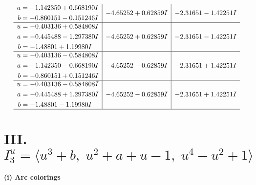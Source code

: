 \documentclass[1p]{elsarticle_modified}
\theoremstyle{definition}
\begin{document}
$$\begin{array}{c|c|c}
\begin{aligned}
a &= -1.142350 + 0.668190 I \\
b &= -0.860151 - 0.151246 I\end{aligned}
 & -4.65252 + 0.62859 I & -2.31651 - 1.42251 I \\ \hline\begin{aligned}
u &= -0.403136 + 0.584808 I \\
a &= -0.445488 - 1.297380 I \\
b &= -1.48801 + 1.19980 I\end{aligned}
 & -4.65252 + 0.62859 I & -2.31651 - 1.42251 I \\ \hline\begin{aligned}
u &= -0.403136 - 0.584808 I \\
a &= -1.142350 - 0.668190 I \\
b &= -0.860151 + 0.151246 I\end{aligned}
 & -4.65252 - 0.62859 I & -2.31651 + 1.42251 I \\ \hline\begin{aligned}
u &= -0.403136 - 0.584808 I \\
a &= -0.445488 + 1.297380 I \\
b &= -1.48801 - 1.19980 I\end{aligned}
 & -4.65252 - 0.62859 I & -2.31651 + 1.42251 I\\
 \hline 
 \end{array}$$\newpage\newpage\renewcommand{\arraystretch}{1}
\centering \section*{III. $I^u_{3}= \langle u^3+b,\;u^2+a+u-1,\;u^4- u^2+1 \rangle$}
\flushleft \textbf{(i) Arc colorings}\\
\end{document}
